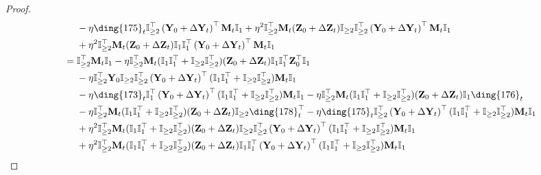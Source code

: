 \documentclass{article}
\theoremstyle{plain}
\theoremstyle{remark}
\def\bY{\mathbf{Y}}
\def\bZ{\mathbf{Z}}
\newcommand{\cc}[1]{\text{\ding{\number\numexpr#1 + 171\relax}}}
\begin{document}
\begin{proof}
\begin{align*}
        &~~~~ -\eta \cc{4}_t \mathbb{I}_{\ge 2}^\top\left(\bY_0+\Delta\bY_t\right)^\top \mathbf{M}_{t}\mathbb{I}_{1} + \eta^2 \mathbb{I}_{\ge2}^\top\mathbf{M}_{t}(\bZ_0+\Delta\bZ_t)\mathbb{I}_{\ge 2}\mathbb{I}_{\ge 2}^\top\left(\bY_0+\Delta\bY_t\right)^\top \mathbf{M}_{t}\mathbb{I}_{1} \\
        &~~~~ + \eta^2 \mathbb{I}_{\ge2}^\top\mathbf{M}_{t}(\bZ_0+\Delta\bZ_t)\mathbb{I}_{1}\mathbb{I}_{1}^\top\left(\bY_0+\Delta\bY_t\right)^\top \mathbf{M}_{t}\mathbb{I}_{1}
        \\
        &=
            \mathbb{I}_{\ge2}^\top\mathbf{M}_{t}\mathbb{I}_{1}
            - \eta\mathbb{I}_{\ge2}^\top \mathbf{M}_{t}(\mathbb{I}_{1}\mathbb{I}_{1}^\top+\mathbb{I}_{\ge 2}\mathbb{I}_{\ge 2}^\top) 
            (\bZ_0+\Delta\bZ_t)\mathbb{I}_{1}\mathbb{I}_{1}^\top \bZ_0^\top\mathbb{I}_{1} 
            \\
            &~~~~ - \eta \mathbb{I}_{\ge2}^\top \bY_0 \mathbb{I}_{\ge2}\mathbb{I}_{\ge2}^\top \left(\bY_0+\Delta\bY_t\right)^\top (\mathbb{I}_{1}\mathbb{I}_{1}^\top+\mathbb{I}_{\ge 2}\mathbb{I}_{\ge 2}^\top)\mathbf{M}_{t} \mathbb{I}_{1} 
        \\
        &~~~~ 
            -\eta \cc{2}_t \mathbb{I}_{1}^\top\left(\bY_0+\Delta\bY_t\right)^\top(\mathbb{I}_{1}\mathbb{I}_{1}^\top+\mathbb{I}_{\ge 2}\mathbb{I}_{\ge 2}^\top)\mathbf{M}_{t}\mathbb{I}_{1} 
            - \eta \mathbb{I}_{\ge2}^\top\mathbf{M}_{t}(\mathbb{I}_{1}\mathbb{I}_{1}^\top+\mathbb{I}_{\ge 2}\mathbb{I}_{\ge 2}^\top)(\bZ_0+\Delta\bZ_t)\mathbb{I}_1\cc{5}_t 
        \\
        &~~~~ 
            - \eta\mathbb{I}_{\ge2}^\top\mathbf{M}_{t}(\mathbb{I}_{1}\mathbb{I}_{1}^\top+\mathbb{I}_{\ge 2}\mathbb{I}_{\ge 2}^\top)(\bZ_0+\Delta\bZ_t)\mathbb{I}_{\ge 2}\cc{7}_t^\top 
            -\eta \cc{4}_t \mathbb{I}_{\ge 2}^\top\left(\bY_0+\Delta\bY_t\right)^\top (\mathbb{I}_{1}\mathbb{I}_{1}^\top+\mathbb{I}_{\ge 2}\mathbb{I}_{\ge 2}^\top)\mathbf{M}_{t}\mathbb{I}_{1} 
        \\
        &~~~~
            + \eta^2 \mathbb{I}_{\ge2}^\top\mathbf{M}_{t}(\mathbb{I}_{1}\mathbb{I}_{1}^\top+\mathbb{I}_{\ge 2}\mathbb{I}_{\ge 2}^\top)(\bZ_0+\Delta\bZ_t)\mathbb{I}_{\ge 2}\mathbb{I}_{\ge 2}^\top\left(\bY_0+\Delta\bY_t\right)^\top (\mathbb{I}_{1}\mathbb{I}_{1}^\top+\mathbb{I}_{\ge 2}\mathbb{I}_{\ge 2}^\top)\mathbf{M}_{t}\mathbb{I}_{1}
        \\
        &~~~~
            + \eta^2 \mathbb{I}_{\ge2}^\top\mathbf{M}_{t}(\mathbb{I}_{1}\mathbb{I}_{1}^\top+\mathbb{I}_{\ge 2}\mathbb{I}_{\ge 2}^\top)(\bZ_0+\Delta\bZ_t)\mathbb{I}_{1}\mathbb{I}_{1}^\top\left(\bY_0+\Delta\bY_t\right)^\top (\mathbb{I}_{1}\mathbb{I}_{1}^\top+\mathbb{I}_{\ge 2}\mathbb{I}_{\ge 2}^\top)\mathbf{M}_{t}\mathbb{I}_{1}

\end{align*}
\end{proof}
\end{document}
